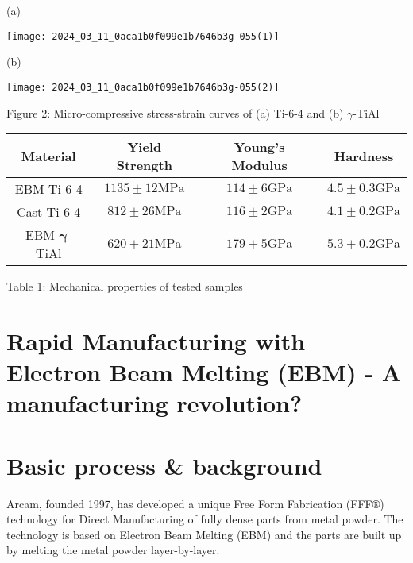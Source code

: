 \documentclass[10pt]{article}
\begin{document}
(a)

\begin{center}
\texttt{[image: 2024\_03\_11\_0aca1b0f099e1b7646b3g-055(1)]}
\end{center}

(b)

\begin{center}
\texttt{[image: 2024\_03\_11\_0aca1b0f099e1b7646b3g-055(2)]}
\end{center}

Figure 2: Micro-compressive stress-strain curves of (a) Ti-6-4 and (b) $\gamma$-TiAl

\begin{center}
\begin{tabular}{|c|c|c|c|}
\hline
Material & Yield Strength & Young's Modulus & Hardness \\
\hline
EBM Ti-6-4 & $1135 \pm 12 \mathrm{MPa}$ & $114 \pm 6 \mathrm{GPa}$ & $4.5 \pm 0.3 \mathrm{GPa}$ \\
\hline
Cast Ti-6-4 & $812 \pm 26 \mathrm{MPa}$ & $116 \pm 2 \mathrm{GPa}$ & $4.1 \pm 0.2 \mathrm{GPa}$ \\
\hline
EBM $\boldsymbol{\gamma}$-TiAl & $620 \pm 21 \mathrm{MPa}$ & $179 \pm 5 \mathrm{GPa}$ & $5.3 \pm 0.2 \mathrm{GPa}$ \\
\hline
\end{tabular}
\end{center}

Table 1: Mechanical properties of tested samples

\section*{Rapid Manufacturing with Electron Beam Melting (EBM) - A manufacturing revolution? }


\begin{abstract}
The Electron Beam Melting technology is the result of intensive research and development and has a wide array of applications within areas such as Rapid Prototyping, Rapid Manufacturing, Tooling and Biomedical Engineering. The technology combines first-class material properties with high build speeds. The presentation will provide a basic understanding of the technology, technical status, applications and ongoing R\&D.
\end{abstract}

\section*{Basic process \& background}
Arcam, founded 1997, has developed a unique Free Form Fabrication (FFF®) technology for Direct Manufacturing of fully dense parts from metal powder. The technology is based on Electron Beam Melting (EBM) and the parts are built up by melting the metal powder layer-by-layer.
\end{document}
